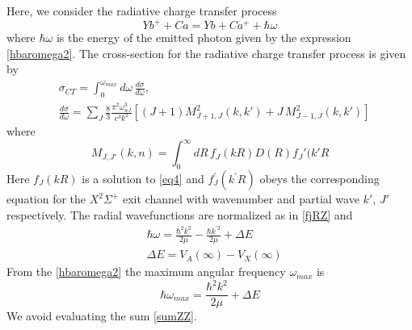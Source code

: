Here, we consider the radiative charge transfer process
\begin{equation}
  Yb^+ + Ca = Yb + Ca^+ + \hbar\omega
\end{equation}
where $ \hbar\omega $ is the energy of the emitted photon given by the expression \eqref{hbaromega2}.
The cross-section for the radiative charge transfer process is given by
\begin{equation}\label{sumZZ}
\begin{split}
& \sigma_{CT} = \int_0^{\omega_{max}}{d\omega\,\frac{d\sigma}{d\omega}},\\[.8em]
& \frac{d\sigma}{d\omega} = \sum_J{\frac{8}{3}\frac{\pi^2\omega_{nJ}^3}{c^3k^2}\left[(J+1)M_{J+1,J}^2(k,k')+J\,M_{J-1,J}^2(k,k')\right] }
\end{split}
\end{equation}
where
\begin{equation}\label{mjjz}
  M_{J,J'}(k,n) = \int_{0}^{\infty}{dR\,f_J(kR)D(R)f_J'(k'R }
\end{equation}
Here $ f_J(kR) $ is a solution to \eqref{eq4} and $ f_J^{'}(k^{'}R) $ obeys the corresponding equation for the $ X^2\Sigma^+ $ exit channel with wavenumber and partial wave $ k' $, $ J'$ respectively.
The radial wavefunctions are normalized as in \eqref{fjRZ} and
\begin{equation}\label{hbaromega2}
\begin{split}
  & \hbar\omega = \frac{\hbar^2 k^2}{2\mu} - \frac{\hbar k^{'2}}{2\mu} + \Delta E \\[.8em]
  & \Delta E = V_A(\infty) - V_X(\infty)
\end{split}
\end{equation}
From the \eqref{hbaromega2} the maximum angular frequency $ \omega_{max} $ is
\begin{equation}
\hbar\omega_{max} = \frac{\hbar^2 k^2}{2\mu} +  \Delta E
\end{equation}
We avoid evaluating the sum \eqref{sumZZ}. \\

